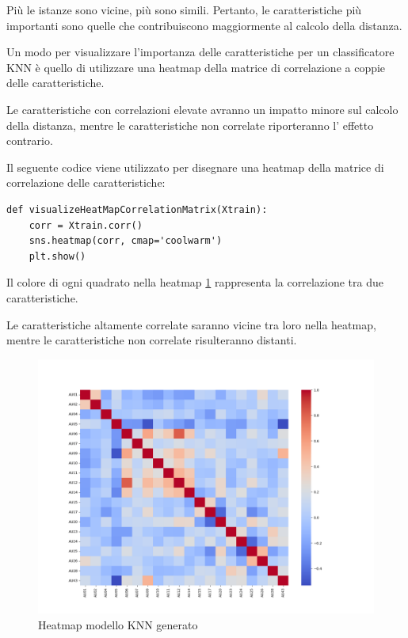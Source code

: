 Più le istanze sono vicine, più sono simili. Pertanto, le caratteristiche più importanti sono quelle che contribuiscono maggiormente al calcolo della distanza.

Un modo per visualizzare l'importanza delle caratteristiche per un classificatore KNN è quello di utilizzare una heatmap della matrice di correlazione a coppie delle caratteristiche. 

Le caratteristiche con correlazioni elevate avranno un impatto minore sul calcolo della distanza, mentre le caratteristiche non correlate riporteranno l' effetto contrario.

Il seguente codice viene utilizzato per disegnare una heatmap della matrice di correlazione delle caratteristiche:
\begin{verbatim}
def visualizeHeatMapCorrelationMatrix(Xtrain):
    corr = Xtrain.corr()
    sns.heatmap(corr, cmap='coolwarm')
    plt.show()
\end{verbatim}

Il colore di ogni quadrato nella heatmap \ref{fig:image15} rappresenta la correlazione tra due caratteristiche. 

Le caratteristiche altamente correlate saranno vicine tra loro nella heatmap, mentre le caratteristiche non correlate risulteranno distanti. 

\begin{figure}
    \begin{center}    
        \includegraphics[width=0.9\linewidth]{images/image39.png}
        \caption{Heatmap modello KNN generato}
        \label{fig:image15}
    \end{center}
\end{figure}

